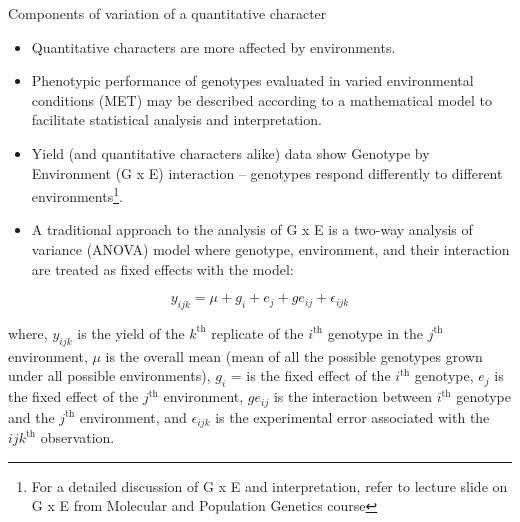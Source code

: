 \documentclass[11pt,ignorenonframetext,aspectratio=169]{beamer}
\providecommand{\tightlist}{%
  \setlength{\itemsep}{0pt}\setlength{\parskip}{0pt}}
\begin{document}
\begin{frame}{Components of variation of a quantitative character}
\protect\hypertarget{components-of-variation-of-a-quantitative-character}{}
\footnotesize

\begin{itemize}
\tightlist
\item
  Quantitative characters are more affected by environments.
\item
  Phenotypic performance of genotypes evaluated in varied environmental
  conditions (MET) may be described according to a mathematical model to
  facilitate statistical analysis and interpretation.
\item
  Yield (and quantitative characters alike) data show Genotype by
  Environment (G x E) interaction -- genotypes respond differently to
  different
  environments\footnote[frame]{For a detailed discussion of G x E and interpretation, refer to lecture slide on G x E from Molecular and Population Genetics course}.
\item
  A traditional approach to the analysis of G x E is a two-way analysis
  of variance (ANOVA) model where genotype, environment, and their
  interaction are treated as fixed effects with the model:
\end{itemize}

\[
y_{ijk} = \mu + g_{i} + e_{j} + ge_{ij} + \epsilon_{ijk}
\]

where, \(y_{ijk}\) is the yield of the \(k^{\text{th}}\) replicate of
the \(i^{\text{th}}\) genotype in the \(j^{\text{th}}\) environment,
\(\mu\) is the overall mean (mean of all the possible genotypes grown
under all possible environments), \(g_{i}\) = is the fixed effect of the
\(i^{\text{th}}\) genotype, \(e_{j}\) is the fixed effect of the
\(j^{\text{th}}\) environment, \(ge_{ij}\) is the interaction between
\(i^{\text{th}}\) genotype and the \(j^{\text{th}}\) environment, and
\(\epsilon_{ijk}\) is the experimental error associated with the
\(ijk^{\text{th}}\) observation.
\end{frame}
\end{document}
